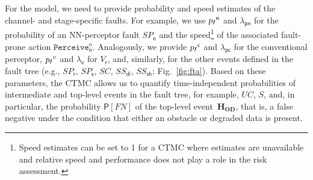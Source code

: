 \documentclass[runningheads,a4paper]{llncs}
\begin{document}
For the model, we need to provide probability and speed estimates of
the channel- and stage-specific faults.  For example, we use
${p_\text{\Lightning}}^\mathsf{n}$ and $\lambda_{\mathsf{pn}}$ for the probability of an
NN-perceptor fault $\mathit{SP}_{\mathsf{n}}$ and the
speed\footnote{Speed estimates can be set to 1 for a CTMC where
  estimates are unavailable and relative speed and performance does
  not play a role in the risk assessment.} of the associated
fault-prone action $\mathtt{Perceive}_{\mathsf{n}}^o$.  Analogously, we
provide ${p_\text{\Lightning}}^\mathsf{c}$ and $\lambda_{\mathsf{pc}}$ for the conventional
perceptor, ${p_\text{\Lightning}}^v$ and $\lambda_{\mathsf{v}}$ for $V_{\mathsf{r}}$, and,
similarly, for the other events defined in the fault tree (e.g.,
$\mathit{SP}_{\mathsf{r}}$, $\mathit{SP}_{\mathsf{s}}$, $\mathit{SC}$,
$\mathit{SS}_{\mathsf{di}}$, $\mathit{SS}_{\mathsf{sh}}$;
Fig.~\ref{fig:fta}).  Based on these parameters, the CTMC allows us to
quantify time-independent probabilities of intermediate and top-level
events in the fault tree, for example, $\mathit{UC}$, $S$, and, in
particular, the probability $\mathsf{P}[\mathit{FN}]$ of the top-level
event~$\mathbf{H}_\mathbf{OD}$, that is, a false negative under the condition that
either an obstacle or degraded data is present.
\end{document}
